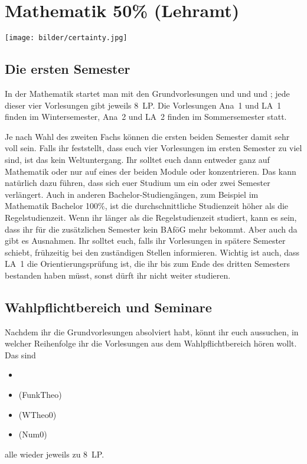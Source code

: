 \section{Mathematik 50\% (Lehramt)}

\begin{figure*}[b]
  \centering
  \texttt{[image: bilder/certainty.jpg]}
\end{figure*}

\subsection{Die ersten Semester}

In der Mathematik startet man mit den Grundvorlesungen  und  und  und ; jede dieser vier Vorlesungen gibt jeweils 8~\gls{LP}. Die Vorlesungen \gls{Ana}~1 und \gls{LA}~1 finden im Wintersemester, \gls{Ana}~2 und \gls{LA}~2 finden im Sommersemester statt.

Je nach Wahl des zweiten Fachs können die ersten beiden Semester damit sehr voll sein. Falls ihr feststellt, dass euch vier Vorlesungen im ersten Semester zu viel sind, ist das kein Weltuntergang. Ihr solltet euch dann entweder ganz auf Mathematik oder nur auf eines der beiden Module  oder  konzentrieren. Das kann natürlich dazu führen, dass sich euer Studium um ein oder zwei Semester verlängert. Auch in anderen Bachelor-Studiengängen, zum Beispiel im Mathematik Bachelor 100\%, ist die durchschnittliche Studienzeit höher als die Regelstudienzeit. Wenn ihr länger als die Regelstudienzeit studiert, kann es sein, dass ihr für die zusätzlichen Semester kein BAföG mehr bekommt. Aber auch da gibt es Ausnahmen. Ihr solltet euch, falls ihr Vorlesungen in spätere Semester schiebt, frühzeitig bei den zuständigen Stellen informieren. Wichtig ist auch, dass \gls{LA}~1 die Orientierungsprüfung ist, die ihr bis zum Ende des dritten Semesters bestanden haben müsst, sonst dürft ihr nicht weiter studieren.


\subsection{Wahlpflichtbereich und Seminare}

Nachdem ihr die Grundvorlesungen absolviert habt, könnt ihr euch aussuchen, in welcher Reihenfolge ihr die Vorlesungen aus dem Wahlpflichtbereich hören wollt. Das sind
\begin{itemize}
  \item {}
  \item {} (\gls{FunkTheo})
  \item {} (\gls{WTheo0})
  \item {} (\gls{Num0})
\end{itemize}
alle wieder jeweils zu 8~\gls{LP}.

